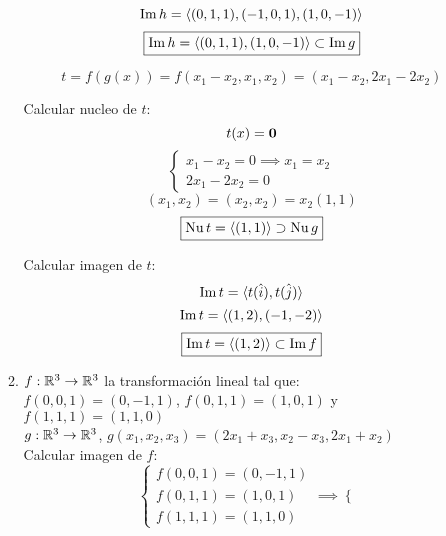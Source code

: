 \documentclass[../practica.root.tex]{subfiles}
\begin{document}
\begin{enumerate}
\begin{enumerate}
\begin{minipage}[t]{0.5\textwidth}
                        \[ \operatorname{Im} h = \langle (0,1,1),(-1,0,1),(1,0,-1) \rangle \]
                        \[ \boxed{\operatorname{Im} h = \langle (0,1,1),(1,0,-1) \rangle \subset \operatorname{Im} g} \]
                    \end{minipage}
                    \[ t = f(g(x)) = f(x_1 - x_2, x_1, x_2) = (x_1 - x_2, 2x_1 - 2x_2) \]
                    \begin{minipage}[t]{0.5\textwidth}
                        Calcular nucleo de $t$:
                        \[ t(x) = \mathbf{0} \]
                        \[
                            \begin{cases}
                                x_1 - x_2 = 0 \implies x_1 = x_2 \\
                                2x_1 - 2x_2 = 0
                            \end{cases}
                        \] \[
                            (x_1, x_2) = (x_2, x_2) = x_2(1,1)
                        \] \[
                            \boxed{\operatorname{Nu} t = \langle (1,1) \rangle \supset \operatorname{Nu} g}
                        \]
                    \end{minipage}
                    \begin{minipage}[t]{0.5\textwidth}
                        Calcular imagen de $t$:
                        \[ \operatorname{Im} t = \langle t(\hat{i}),t(\hat{j}) \rangle \]
                        \[ \operatorname{Im} t = \langle (1,2),(-1,-2) \rangle \]
                        \[ \boxed{\operatorname{Im} t = \langle (1,2) \rangle \subset \operatorname{Im} f } \]
                    \end{minipage}
              \item $ f : \mathbb{R}^3 \to \mathbb{R}^3 $ la transformación lineal tal que: \\
                    $ f(0,0,1)=(0,-1,1) $, $ f(0,1,1)=(1,0,1) $ y $ f(1,1,1)=(1,1,0) $ \\
                    $ g : \mathbb{R}^3 \to \mathbb{R}^3 $, $g(x_1, x_2, x_3) = (2x_1 + x_3, x_2 - x_3, 2x_1 + x_2)$ \\
                    Calcular imagen de $f$:
                    \[
                        \begin{cases}
                            f(0,0,1) = (0, -1, 1) \\
                            f(0,1,1) = (1,  0, 1) \\
                            f(1,1,1) = (1,  1, 0)
                        \end{cases}
                        \implies
                        \begin{cases}

\end{cases}\]
\end{enumerate}
\end{enumerate}
\end{document}
